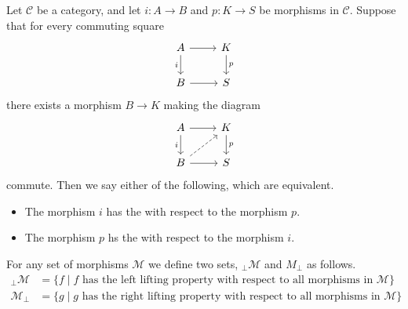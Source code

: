\documentclass[main.tex]{subfiles}
\begin{document}
\begin{definition}
  \label{def:lifting_property}
  Let $\mathcal{C}$ be a category, and let $i\colon A \to B$ and $p\colon K \to S$ be morphisms in $\mathcal{C}$. Suppose that for every commuting square
  \begin{equation*}
    \begin{tikzcd}
      A
      \arrow[r]
      \arrow[d, swap, "i"]
      & K
      \arrow[d, "p"]
      \\
      B
      \arrow[r]
      & S
    \end{tikzcd}
  \end{equation*}
  there exists a morphism $B \to K$ making the diagram
  \begin{equation*}
    \begin{tikzcd}
      A
      \arrow[r]
      \arrow[d, swap, "i"]
      & K
      \arrow[d, "p"]
      \\
      B
      \arrow[ur, dashed]
      \arrow[r]
      & S
    \end{tikzcd}
  \end{equation*}
  commute. Then we say either of the following, which are equivalent.
  \begin{itemize}
    \item The morphism $i$ has the  with respect to the morphism $p$.

    \item The morphism $p$ hs the  with respect to the morphism $i$.
  \end{itemize}

  For any set of morphisms $\mathcal{M}$ we define two sets, $_{\perp}\mathcal{M}$ and $M_{\perp}$ as follows.
  \begin{align*}
    {}_{\perp}\mathcal{M} &= \{f \mid f \text{ has the left lifting property with respect to all morphisms in $\mathcal{M}$}\} \\
    \mathcal{M}_{\perp} &= \{g \mid g \text{ has the right lifting property with respect to all morphisms in $\mathcal{M}$}\} \\
  \end{align*}
\end{definition}
\end{document}
